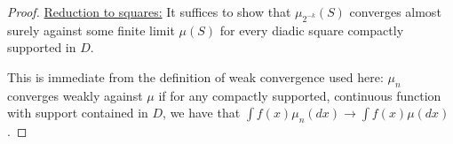 \documentclass[11pt,reqno]{amsart}
\numberwithin{equation}{section}
\newcommand{\deq}{\mathrel{\mathop:}=}
\newcommand{\eps}{\varepsilon}
\begin{document}
\begin{proof}
	\underline{Reduction to squares:} It suffices to show that $\mu_{2^{-k}}(S)$ converges almost surely against some finite limit $\mu(S)$ for every diadic square compactly supported in $D$.
	
	This is immediate from the definition of weak convergence used here: $\mu_n$ converges weakly against $\mu$ if for any compactly supported, continuous function with support contained in $D$, we have that $\int f(x)\mu_n(dx)\rightarrow\int f(x) \mu(dx)$.
	


\end{proof}
\end{document}
